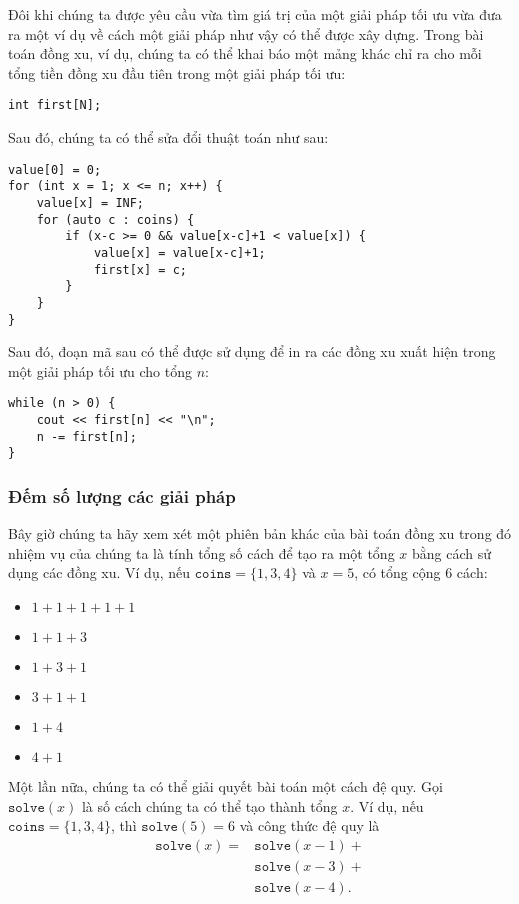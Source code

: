 Đôi khi chúng ta được yêu cầu vừa tìm giá trị
của một giải pháp tối ưu vừa đưa ra
một ví dụ về cách một giải pháp như vậy có thể được xây dựng.
Trong bài toán đồng xu, ví dụ,
chúng ta có thể khai báo một mảng khác
chỉ ra cho
mỗi tổng tiền đồng xu đầu tiên 
trong một giải pháp tối ưu:
\begin{lstlisting}
int first[N];
\end{lstlisting}
Sau đó, chúng ta có thể sửa đổi thuật toán như sau:
\begin{lstlisting}
value[0] = 0;
for (int x = 1; x <= n; x++) {
    value[x] = INF;
    for (auto c : coins) {
        if (x-c >= 0 && value[x-c]+1 < value[x]) {
            value[x] = value[x-c]+1;
            first[x] = c;
        }
    }
}
\end{lstlisting}
Sau đó, đoạn mã sau có thể được sử dụng để
in ra các đồng xu xuất hiện trong một giải pháp tối ưu cho
tổng $n$:
\begin{lstlisting}
while (n > 0) {
    cout << first[n] << "\n";
    n -= first[n];
}
\end{lstlisting}

\subsubsection{Đếm số lượng các giải pháp}

Bây giờ chúng ta hãy xem xét một phiên bản khác
của bài toán đồng xu trong đó nhiệm vụ của chúng ta là
tính tổng số cách
để tạo ra một tổng $x$ bằng cách sử dụng các đồng xu.
Ví dụ, nếu $\texttt{coins}=\{1,3,4\}$ và
$x=5$, có tổng cộng 6 cách:

\begin{multicols}{2}
\begin{itemize}
\item $1+1+1+1+1$
\item $1+1+3$
\item $1+3+1$
\item $3+1+1$
\item $1+4$
\item $4+1$
\end{itemize}
\end{multicols}

Một lần nữa, chúng ta có thể giải quyết bài toán một cách đệ quy.
Gọi $\texttt{solve}(x)$ là số cách
chúng ta có thể tạo thành tổng $x$.
Ví dụ, nếu $\texttt{coins}=\{1,3,4\}$,
thì $\texttt{solve}(5)=6$ và công thức đệ quy là
\begin{equation*}
\begin{split}
\texttt{solve}(x) = & \texttt{solve}(x-1) + \\
                    & \texttt{solve}(x-3) + \\
                    & \texttt{solve}(x-4)  .
\end{split}
\end{equation*}

